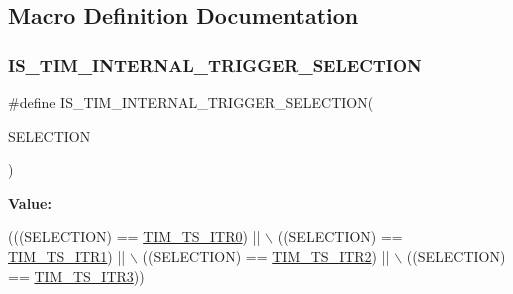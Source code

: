 \subsection{Macro Definition Documentation}
\mbox{\label{group___t_i_m___internal___trigger___selection_ga1ce6c387021e2fdaf3fa3d7cd3eae962}} 
\subsubsection{\texorpdfstring{I\+S\+\_\+\+T\+I\+M\+\_\+\+I\+N\+T\+E\+R\+N\+A\+L\+\_\+\+T\+R\+I\+G\+G\+E\+R\+\_\+\+S\+E\+L\+E\+C\+T\+I\+ON}{IS\_TIM\_INTERNAL\_TRIGGER\_SELECTION}}
{\footnotesize\ttfamily \#define I\+S\+\_\+\+T\+I\+M\+\_\+\+I\+N\+T\+E\+R\+N\+A\+L\+\_\+\+T\+R\+I\+G\+G\+E\+R\+\_\+\+S\+E\+L\+E\+C\+T\+I\+ON(\begin{DoxyParamCaption}\item[{}]{S\+E\+L\+E\+C\+T\+I\+ON }\end{DoxyParamCaption})}

{\bfseries Value\+:}
\begin{DoxyCode}
(((SELECTION) == \hyperlink{group___t_i_m___internal___trigger___selection_gab7cf2b7db3956d4fd1e5a5d84f4891e7}{TIM\_TS\_ITR0}) || \(\backslash\)
                                                      ((SELECTION) == 
      \hyperlink{group___t_i_m___internal___trigger___selection_gad90fbca297153ca9c0112a67ea2c6cb3}{TIM\_TS\_ITR1}) || \(\backslash\)
                                                      ((SELECTION) == 
      \hyperlink{group___t_i_m___internal___trigger___selection_ga8599ba58a5f911d648503c7ac55d4320}{TIM\_TS\_ITR2}) || \(\backslash\)
                                                      ((SELECTION) == 
      \hyperlink{group___t_i_m___internal___trigger___selection_ga63183e611b91c5847040172c0069514d}{TIM\_TS\_ITR3}))
\end{DoxyCode}


